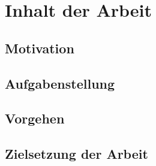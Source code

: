 

\chapter{Inhalt der Arbeit}

\section{Motivation}


\section{Aufgabenstellung}


\section{Vorgehen}


\section{Zielsetzung der Arbeit}

